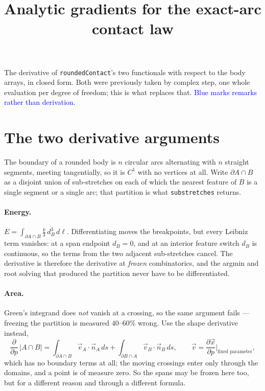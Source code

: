 \documentclass[11pt]{article}
\title{Analytic gradients for the exact-arc contact law}
\author{}
\date{}
\newcommand{\vv}[1]{\vec{#1}}
\newcommand{\code}[1]{\texttt{#1}}
\newcommand{\note}[1]{\textcolor{blue}{#1}}
\begin{document}
\maketitle

\noindent
The derivative of \code{roundedContact}'s two functionals with respect to the body arrays, in closed
form. Both were previously taken by complex step, one whole evaluation per degree of freedom; this is
what replaces that. \note{Blue marks remarks rather than derivation.}

\section{The two derivative arguments}

The boundary of a rounded body is $n$ circular arcs alternating with $n$ straight segments, meeting
tangentially, so it is $C^1$ with no vertices at all. Write $\partial A\cap B$ as a disjoint union of
sub-stretches on each of which the nearest feature of $B$ is a single segment or a single arc; that
partition is what \code{substretches} returns.

\paragraph{Energy.} $E=\int_{\partial A\cap B}\tfrac{k}{3}\,d_B^3\,d\ell$. Differentiating moves the
breakpoints, but every Leibniz term vanishes: at a span endpoint $d_B=0$, and at an interior feature
switch $d_B$ is continuous, so the terms from the two adjacent sub-stretches cancel. The derivative is
therefore the derivative at \emph{frozen} combinatorics, and the argmin and root solving that produced
the partition never have to be differentiated.

\paragraph{Area.} Green's integrand does \emph{not} vanish at a crossing, so the same argument fails
--- freezing the partition is measured $40$--$60\%$ wrong. Use the shape derivative instead,
\begin{equation}
  \frac{\partial}{\partial p}\,|A\cap B|
  = \int_{\partial A\cap B}\!\!\vv v_A\cdot \vv n_A\,ds
  + \int_{\partial B\cap A}\!\!\vv v_B\cdot \vv n_B\,ds ,
  \qquad \vv v=\frac{\partial \vv x}{\partial p}\Big|_{\text{fixed parameter}},
\end{equation}
which has no boundary terms at all; the moving crossings enter only through the domains, and a point
is of measure zero. So the spans may be frozen here too, but for a different reason and through a
different formula.
\end{document}
